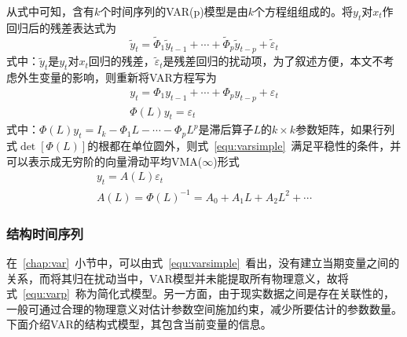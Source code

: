 从式中可知，含有$k$个时间序列的VAR(p)模型是由$k$个方程组组成的。将$y_t$对$x_t$作回归后的残差表达式为
\begin{equation}
	{{\tilde{y}}_{t}}={{\tilde{\Phi }}_{1}}{{\tilde{y}}_{t-1}}+\cdots +{{\tilde{\Phi }}_{p}}{{\tilde{y}}_{t-p}}+{{\tilde{\varepsilon }}_{t}}
\end{equation}
式中：$\tilde{y}_{t}$是$y_t$对$x_t$回归的残差，${{\tilde{\varepsilon }}_{t}}$是残差回归的扰动项，为了叙述方便，本文不考虑外生变量的影响，则重新将VAR方程写为
\begin{gather}
	\label{equ:varsimple}
	{{y}_{t}}={{\Phi }_{1}}{{y}_{t-1}}+\cdots +{{\Phi }_{p}}{{y}_{t-p}}+{{\varepsilon }_{t}} \\
	{\Phi }(L)y_t={\varepsilon }_{t}
\end{gather}
式中：${\Phi }(L)y_t=I_k-{\Phi }_{1}L-\cdots -{\Phi }_{p}L^p$是滞后算子$L$的$k\times k$参数矩阵，如果行列式$\det \left[ \Phi (L) \right]$的根都在单位圆外，则式~\ref{equ:varsimple}~满足平稳性的条件，并可以表示成无穷阶的向量滑动平均VMA($\infty $)形式
\begin{gather}
	\label{equ:vmap}
	{{y}_{t}}=A(L){{\varepsilon }_{t}} \\ 
	A(L)=\Phi {{(L)}^{-1}}={{A}_{0}}+{{A}_{1}}L+{{A}_{2}}{{L}^{2}}+\cdots 
\end{gather}

\subsubsection{结构时间序列}

在~\ref{chap:var}~小节中，可以由式~\ref{equ:varsimple}~看出，没有建立当期变量之间的关系，而将其归在扰动当中，VAR模型并未能提取所有物理意义，故将式~\ref{equ:varp}~称为简化式模型。另一方面，由于现实数据之间是存在关联性的，一般可通过合理的物理意义对估计参数空间施加约束，减少所要估计的参数数量。下面介绍VAR的结构式模型，其包含当前变量的信息。

